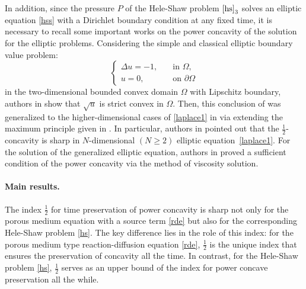 \documentclass[10pt]{article}         %
\numberwithin{equation}{section}
\begin{document}
\vspace{2mm}


In addition, since the pressure $P$ of the Hele-Shaw problem $\eqref{hs}_3$ solves an elliptic equation \eqref{hss} with a Dirichlet boundary condition at any fixed time,  it is necessary to recall some important works on the power concavity of the solution for the elliptic problems.  Considering the simple  and classical elliptic boundary value problem:
\begin{equation}\label{laplace1}
\begin{cases}
    \Delta u=-1,\quad&\text{in }\Omega,\\
    u=0,\quad&\text{on }\partial\Omega
\end{cases}\end{equation}
in the two-dimensional bounded convex domain $\Omega$ with Lipschitz boundary, authors in \cite{ML1971} show that $\sqrt{u}$ is strict convex in $\Omega$. Then, this conclusion of  \cite{ML1971} was generalized  to the higher-dimensional cases of \eqref{laplace1} in \cite{KB1986,KA1985} via extending the maximum principle given in \cite{KN1983}. In particular, authors in \cite{KA1985} pointed out that the $\frac{1}{2}$-concavity  is sharp in $N$-dimensional $(N\geq2)$ elliptic equation~\eqref{laplace1}. For the solution of the generalized elliptic equation, authors in \cite{BS2013} proved a sufficient condition of the power concavity via the method of viscosity solution. 


\paragraph{Main results.} 





The index $\frac{1}{2}$ for time preservation of power concavity  is  sharp not only for the porous medium  equation with a source term  \eqref{rde} but also for the corresponding Hele-Shaw problem \eqref{hs}. The key difference lies in the role of this index: for the porous medium type reaction-diffusion equation \eqref{rde}, $\frac{1}{2}$ is the unique index that ensures the preservation of concavity all the time. In contrast, for the Hele-Shaw problem \eqref{hs}, $\frac{1}{2}$ serves as an upper bound of the index for power concave preservation all the while.
\end{document}
